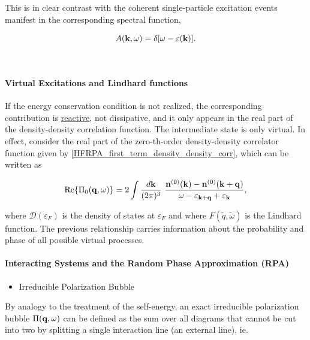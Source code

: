This is in clear contrast with the coherent single-particle excitation events manifest in the corresponding spectral function,

\begin{equation}
    A({\bf k}, \omega) = \delta[\omega - \varepsilon({\bf k})]. 
\end{equation}

\blanky \\

\paragraph{Virtual Excitations and Lindhard functions}

If the energy conservation condition is not realized, the corresponding contribution is \underline{reactive}, not dissipative, and it only appears in the real part of the density-density correlation function. The intermediate state is only virtual. In effect, consider the real part of the zero-th-order density-density correlator function given by \cref{HFRPA_first_term_density_density_corr}, which can be written as 

\begin{equation}
    \Re{\Pi_0({\bf q}, \omega)} = 2 \int \frac{d{\bf k}}{(2\pi)^3} \textnormal{ } \frac{{\bf n}^{(0)}({\bf k}) - {\bf n}^{(0)}({\bf k+q})}{\omega - \varepsilon_{{\bf k+q}} + \varepsilon_{{\bf k}}},
\end{equation}

where $\mathcal{D}(\varepsilon_F)$ is the density of states at $\varepsilon_F$ and where $F(\tilde{q}, \tilde{\omega})$ is the Lindhard function. The previous relationship carries information about the probability and phase of all possible virtual processes. \\

\paragraph{Interacting Systems and the Random Phase Approximation (RPA)}

\begin{itemize}
    \item Irreducible Polarization Bubble
\end{itemize}

By analogy to the treatment of the self-energy, an exact irreducible polarization bubble $\Pi({\bf q}, \omega)$ can be defined as the sum over all diagrams that cannot be cut into two by splitting a single interaction line (an external line), ie.

